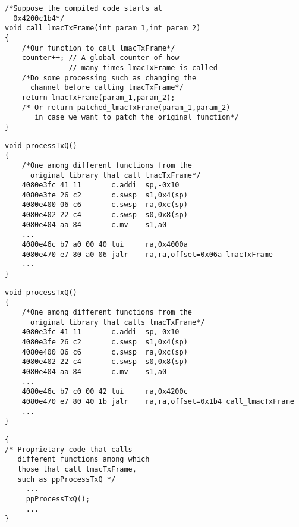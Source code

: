 \newsavebox\funcalllmactxframe
\begin{lrbox}{\funcalllmactxframe}
\begin{lstlisting}
/*Suppose the compiled code starts at 
  0x4200c1b4*/
void call_lmacTxFrame(int param_1,int param_2)
{
    /*Our function to call lmacTxFrame*/
    counter++; // A global counter of how 
               // many times lmacTxFrame is called
    /*Do some processing such as changing the
      channel before calling lmacTxFrame*/
    return lmacTxFrame(param_1,param_2);
    /* Or return patched_lmacTxFrame(param_1,param_2)
       in case we want to patch the original function*/
}
\end{lstlisting}
\end{lrbox}

\newsavebox\funprocesstxq
\begin{lrbox}{\funprocesstxq}
\begin{lstlisting}
void processTxQ()
{
    /*One among different functions from the 
      original library that call lmacTxFrame*/
    4080e3fc 41 11       c.addi  sp,-0x10
    4080e3fe 26 c2       c.swsp  s1,0x4(sp)
    4080e400 06 c6       c.swsp  ra,0xc(sp)
    4080e402 22 c4       c.swsp  s0,0x8(sp)
    4080e404 aa 84       c.mv    s1,a0
    ... 
    4080e46c b7 a0 00 40 lui     ra,0x4000a
    4080e470 e7 80 a0 06 jalr    ra,ra,offset=0x06a lmacTxFrame 
    ...
}
\end{lstlisting}
\end{lrbox}


\newsavebox\funprocesstxqaft
\begin{lrbox}{\funprocesstxqaft}
\begin{lstlisting}
void processTxQ()
{
    /*One among different functions from the 
      original library that calls lmacTxFrame*/
    4080e3fc 41 11       c.addi  sp,-0x10
    4080e3fe 26 c2       c.swsp  s1,0x4(sp)
    4080e400 06 c6       c.swsp  ra,0xc(sp)
    4080e402 22 c4       c.swsp  s0,0x8(sp)
    4080e404 aa 84       c.mv    s1,a0
    ... 
    4080e46c b7 c0 00 42 lui     ra,0x4200c
    4080e470 e7 80 40 1b jalr    ra,ra,offset=0x1b4 call_lmacTxFrame 
    ...
}
\end{lstlisting}
\end{lrbox}

\newsavebox\funpropcode
\begin{lrbox}{\funpropcode}
\begin{lstlisting}
{
/* Proprietary code that calls 
   different functions among which
   those that call lmacTxFrame,
   such as ppProcessTxQ */
     ...
     ppProcessTxQ();
     ...
}
\end{lstlisting}
\end{lrbox}


